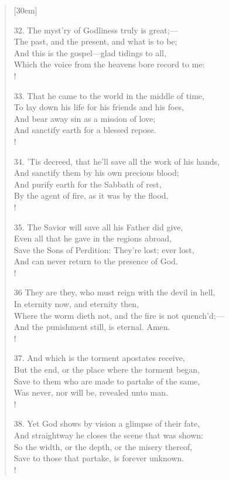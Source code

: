 \begin{verse}[30em]
\begin{altverse}
				32. The myst'ry of Godliness truly is great;--- \\ 
				The past, and the present, and what is to be; \\ 
				And this is the gospel---glad tidings to all, \\ 
				Which the voice from the heavens bore record to me: \\! 
				 
				33. That he came to the world in the middle of time, \\ 
				To lay down his life for his friends and his foes, \\ 
				And bear away sin as a mission of love; \\ 
				And sanctify earth for a blessed repose. \\!
				 
				34. 'Tis decreed, that he'll save all the work of his hands, \\ 
				And sanctify them by his own precious blood; \\ 
				And purify earth for the Sabbath of rest, \\ 
				By the agent of fire, as it was by the flood. \\!
				 
				35. The Savior will save all his Father did give, \\ 
				Even all that he gave in the regions abroad, \\ 
				Save the Sons of Perdition: They're lost; ever lost, \\ 
				And can never return to the presence of God. \\!
				 
				36 They are they, who must reign with the devil in hell, \\ 
				In eternity now, and eternity then, \\ 
				Where the worm dieth not, and the fire is not quench'd;--- \\ 
				And the punishment still, is eternal. Amen. \\!
				 
				37. And which is the torment apostates receive, \\ 
				But the end, or the place where the torment began, \\ 
				Save to them who are made to partake of the same, \\ 
				Was never, nor will be, revealed unto man. \\!
				 
				38. Yet God shows by vision a glimpse of their fate, \\ 
				And straightway he closes the scene that was shown: \\ 
				So the width, or the depth, or the misery thereof, \\ 
				Save to those that partake, is forever unknown. \\!
				 

\end{altverse}
\end{verse}
